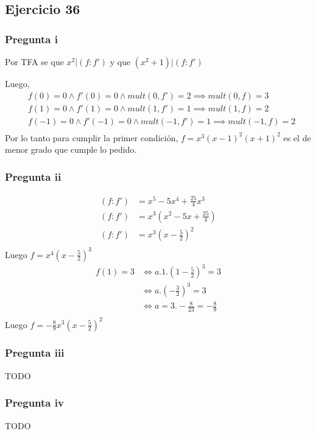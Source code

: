 \subsection{Ejercicio 36}

\subsubsection{Pregunta i}

Por TFA se que $ x^2|(f:f') $ y que $ (x^2+1) | (f:f') $

Luego,
\begin{align*}
    &f(0) = 0 \wedge f'(0) = 0 \wedge mult(0,f') = 2 \implies mult(0,f) = 3 \\
    &f(1) = 0 \wedge f'(1) = 0 \wedge mult(1,f') = 1 \implies mult(1,f) = 2 \\
    &f(-1) = 0 \wedge f'(-1) = 0 \wedge mult(-1,f') = 1 \implies mult(-1,f) = 2 \\
\end{align*}
Por lo tanto para cumplir la primer condición, $ f = x^3(x-1)^2(x+1)^2 $ es el de menor grado que cumple lo pedido.

\subsubsection{Pregunta ii}

\begin{align*}
    (f:f') &= x^5-5x^4+\frac{25}{4}x^3 \\
    (f:f') &= x^3(x^2-5x+\frac{25}{4}) \\
    (f:f') &= x^3(x-\frac{5}{2})^2 \\
\end{align*}
Luego $ f = x^4(x-\frac{5}{2})^3 $
\begin{align*}
    f(1) = 3 &\iff a.1.(1-\frac{5}{2})^3 = 3 \\
    &\iff a.(-\frac{3}{2})^3 = 3 \\
    &\iff a = 3. -\frac{8}{23} = -\frac{8}{9} \\
\end{align*}
Luego $ f = -\frac{8}{9}x^3(x-\frac{5}{2})^2 $

\subsubsection{Pregunta iii}
TODO

\subsubsection{Pregunta iv}
TODO

